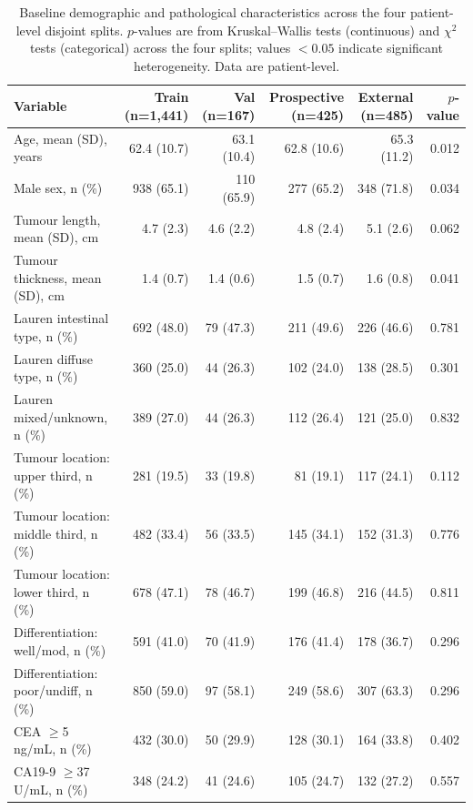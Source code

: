 \documentclass[11pt,a4paper]{article}
\begin{document}
\begin{table}[t]
\caption{Baseline demographic and pathological characteristics across the four patient-level disjoint splits. $p$-values are from Kruskal--Wallis tests (continuous) and $\chi^2$ tests (categorical) across the four splits; values $<0.05$ indicate significant heterogeneity. Data are patient-level.}
\label{tab:baseline}
\centering
\small
\begin{tabular}{lrrrrr}
\toprule
\textbf{Variable} & \textbf{Train (n=1{,}441)} & \textbf{Val (n=167)} & \textbf{Prospective (n=425)} & \textbf{External (n=485)} & \textbf{$p$-value} \\
\midrule
Age, mean (SD), years              & 62.4 (10.7) & 63.1 (10.4) & 62.8 (10.6) & 65.3 (11.2) & 0.012 \\
Male sex, n (\%)                    & 938 (65.1)  & 110 (65.9)  & 277 (65.2)  & 348 (71.8)  & 0.034 \\
Tumour length, mean (SD), cm        & 4.7  (2.3)  & 4.6  (2.2)  & 4.8  (2.4)  & 5.1  (2.6)  & 0.062 \\
Tumour thickness, mean (SD), cm     & 1.4  (0.7)  & 1.4  (0.6)  & 1.5  (0.7)  & 1.6  (0.8)  & 0.041 \\
Lauren intestinal type, n (\%)      & 692 (48.0)  & 79  (47.3)  & 211 (49.6)  & 226 (46.6)  & 0.781 \\
Lauren diffuse type, n (\%)         & 360 (25.0)  & 44  (26.3)  & 102 (24.0)  & 138 (28.5)  & 0.301 \\
Lauren mixed/unknown, n (\%)        & 389 (27.0)  & 44  (26.3)  & 112 (26.4)  & 121 (25.0)  & 0.832 \\
Tumour location: upper third, n (\%) & 281 (19.5)  & 33  (19.8)  & 81  (19.1)  & 117 (24.1)  & 0.112 \\
Tumour location: middle third, n (\%) & 482 (33.4) & 56  (33.5)  & 145 (34.1)  & 152 (31.3)  & 0.776 \\
Tumour location: lower third, n (\%) & 678 (47.1) & 78  (46.7)  & 199 (46.8)  & 216 (44.5)  & 0.811 \\
Differentiation: well/mod, n (\%)   & 591 (41.0)  & 70  (41.9)  & 176 (41.4)  & 178 (36.7)  & 0.296 \\
Differentiation: poor/undiff, n (\%) & 850 (59.0)  & 97  (58.1)  & 249 (58.6)  & 307 (63.3)  & 0.296 \\
CEA $\geq$5 ng/mL, n (\%)           & 432 (30.0)  & 50  (29.9)  & 128 (30.1)  & 164 (33.8)  & 0.402 \\
CA19-9 $\geq$37 U/mL, n (\%)        & 348 (24.2)  & 41  (24.6)  & 105 (24.7)  & 132 (27.2)  & 0.557 \\
\bottomrule
\end{tabular}
\end{table}
\end{document}
